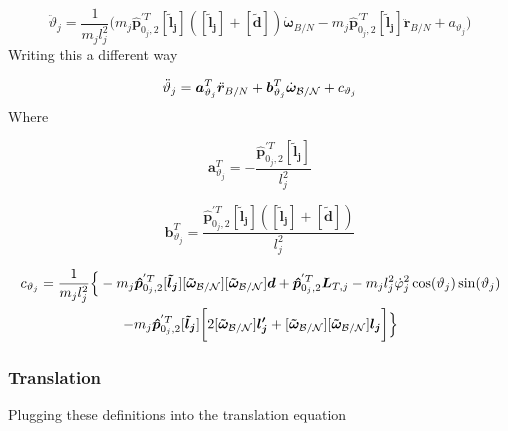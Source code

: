 \begin{equation}
	\ddot \vartheta_j =\frac{1}{m_j l_j^2} \Big(m_{j}\bm{\hat{p}}_{0_j,2}^{'T} [\bm{\tilde{l}_j}]([\bm{\tilde{l}_j}] + [\bm{\tilde{d}}])\bm{\dot{\omega}}_{B/N}
	-m_{j} \bm{\hat{p}}_{0_j,2}^{'T} [\bm{\tilde{l}_j}] \bm{\ddot{r}}_{B/N} + a_{\vartheta_j} \Big)
	\label{eq:BSM8}
\end{equation}
Writing this a different way

\begin{equation}
	\ddot \vartheta_j = \bm a_{\vartheta_j}^T \ddot{\bm r}_{B/N} + \bm b_{\vartheta_j}^T \dot{\bm\omega}_{\cal B/N} + c_{\vartheta_j}
	\label{eq:BSM9}
\end{equation}
Where

\begin{equation}
	\bm a_{\vartheta_j}^{T} = - \frac{ \bm{\hat{p}}_{0_j,2}^{'T} [\bm{\tilde{l}_j}]}{ l_j^2}
	\label{eq:BSM10}
\end{equation}

\begin{equation}
	\bm b_{\vartheta_j}^{T} = \frac{\bm{\hat{p}}_{0_j,2}^{'T} [\bm{\tilde{l}_j}]( [\bm{\tilde{l}_j}] + [\bm{\tilde{d}}])}{ l_j^2}
	\label{eq:BSM11}
\end{equation}

\begin{multline}
	c_{\vartheta_j} = \frac{1}{m_j l_j^2}\Big\{-m_{j} \bm{\hat{p}}_{0_j,2}^{'T}[\bm{\tilde{l}_j}][\bm{\tilde{\omega}}_{\cal B/N}][\bm{\tilde{\omega}}_{\cal B/N}] \bm{d}+\bm{\hat{p}}_{0_j,2}^{'T} \bm{L}_{T,j}-m_j l_j^2\dot{\varphi}_j^2\cos(\vartheta_j)\sin(\vartheta_j)\\- m_j \bm{\hat{p}}_{0_j,2}^{'T} [\bm{\tilde{l}_j}]\bigg[2[\bm{\tilde{\omega}}_{\cal B/N}] \bm{l_j'}+[\bm{\tilde{\omega}}_{\cal B/N}][\bm{\tilde{\omega}}_{\cal B/N}] \bm{l_j}\bigg] \Big\}
	\label{eq:BSM12}
\end{multline}

\subsubsection{Translation}

Plugging these definitions into the translation equation

